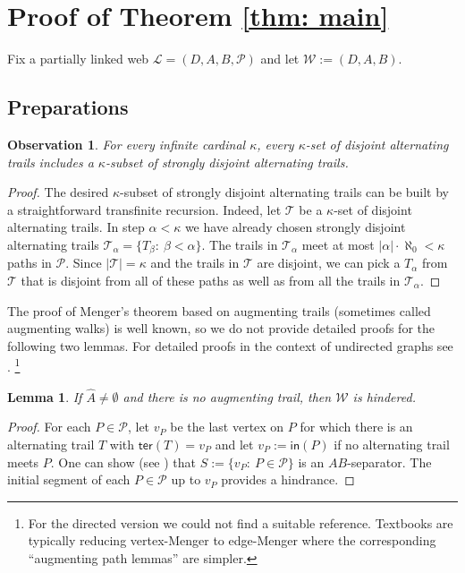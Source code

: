 \documentclass[12pt,a4paper]{amsart}
\theoremstyle{plain}
\newtheorem{lemma}[theorem]{Lemma}
\newtheorem{observation}[theorem]{Observation}
\theoremstyle{definition}
\begin{document}
 

\section{Proof of Theorem \ref{thm: main}}\label{sec: proof}
Fix a partially linked web $ \mathcal{L}=(D,A,B,\mathcal{P}) $  and let  $ \mathcal{W}:=(D,A,B) $. 
\subsection{Preparations}
\begin{observation}\label{obs: dis to strongly dis}
For every infinite cardinal $ \kappa $, every $ \kappa $-set of disjoint alternating trails includes a $ \kappa $-subset of 
strongly 
disjoint alternating trails.
\end{observation}
\begin{proof}
The desired $ \kappa $-subset of strongly 
disjoint alternating trails can be built by a straightforward transfinite recursion. Indeed, let $ \mathcal{T} $ be a $ \kappa $-set of disjoint 
alternating trails.  In step $ \alpha<\kappa $ we have already chosen strongly 
disjoint alternating trails $ \mathcal{T}_\alpha=\{ T_\beta:\ \beta<\alpha \} $. The trails in $ \mathcal{T}_\alpha $ meet at most 
$ \left|\alpha\right| \cdot \aleph_0<\kappa $ paths in $ \mathcal{P} $. Since $ \left|\mathcal{T}\right|=\kappa $ and the trails in $ \mathcal{T} $ are 
disjoint, we can pick a $ T_\alpha $ from $ \mathcal{T} $ that is disjoint from all of these paths as well as from all the trails 
in $ \mathcal{T}_\alpha $. 
\end{proof}

The proof of Menger's theorem  based on augmenting trails (sometimes called augmenting walks)  is well known, so we do 
not 
provide detailed proofs for the following two lemmas. For detailed proofs in the context of undirected graphs see 
\cite[Lemma 3.3.2 and 3.3.3]{diestel2017graph}. \footnote{For the directed version we could not find a suitable 
reference. Textbooks are typically reducing vertex-Menger to edge-Menger where the corresponding 
``augmenting path 
lemmas'' are simpler. }
\begin{lemma}\label{lem: no aug hind}
If  $ \widehat{A}\neq \emptyset  $ and there is no augmenting trail, then $ \mathcal{W} $ is hindered. 
\end{lemma}
\begin{proof}
For each $ P\in \mathcal{P} $, let $ v_P $ be the last vertex on $ P $ for which there is an alternating trail $ T $ with $ 
\mathsf{ter}(T)=v_P $ and let $ v_P:=\mathsf{in}(P) $ if no alternating trail meets $ P $. One 
can show (see \cite[Lemma 3.3.3]{diestel2017graph}) that $ S:=\{ v_P:\ P\in \mathcal{P} \} $ is an 
$ 
AB $-separator. The initial segment 
of  each $ P\in \mathcal{P} $ up to $ v_P $   provides a hindrance. 
\end{proof}
\end{document}
